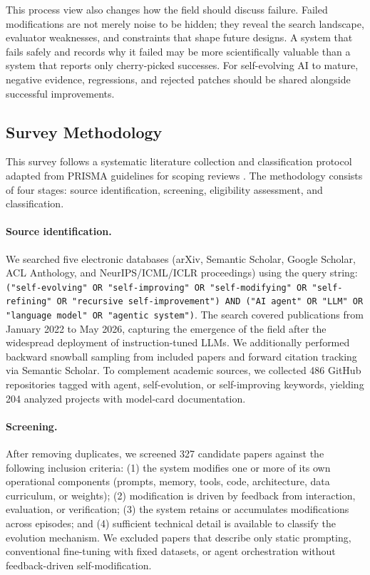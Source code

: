 This process view also changes how the field should discuss failure. Failed modifications are not merely noise to be hidden; they reveal the search landscape, evaluator weaknesses, and constraints that shape future designs. A system that fails safely and records why it failed may be more scientifically valuable than a system that reports only cherry-picked successes. For self-evolving AI to mature, negative evidence, regressions, and rejected patches should be shared alongside successful improvements.

\subsection{Survey Methodology}
\label{subsec:intro-methodology}

This survey follows a systematic literature collection and classification protocol adapted from PRISMA guidelines for scoping reviews \cite{moher2009preferred}. The methodology consists of four stages: source identification, screening, eligibility assessment, and classification.

\paragraph{Source identification.} We searched five electronic databases (arXiv, Semantic Scholar, Google Scholar, ACL Anthology, and NeurIPS/ICML/ICLR proceedings) using the query string: \texttt{("self-evolving" OR "self-improving" OR "self-modifying" OR "self-refining" OR "recursive self-improvement") AND ("AI agent" OR "LLM" OR "language model" OR "agentic system")}. The search covered publications from January 2022 to May 2026, capturing the emergence of the field after the widespread deployment of instruction-tuned LLMs. We additionally performed backward snowball sampling from included papers and forward citation tracking via Semantic Scholar. To complement academic sources, we collected 486 GitHub repositories tagged with agent, self-evolution, or self-improving keywords, yielding 204 analyzed projects with model-card documentation.

\paragraph{Screening.} After removing duplicates, we screened 327 candidate papers against the following inclusion criteria: (1) the system modifies one or more of its own operational components (prompts, memory, tools, code, architecture, data curriculum, or weights); (2) modification is driven by feedback from interaction, evaluation, or verification; (3) the system retains or accumulates modifications across episodes; and (4) sufficient technical detail is available to classify the evolution mechanism. We excluded papers that describe only static prompting, conventional fine-tuning with fixed datasets, or agent orchestration without feedback-driven self-modification.


